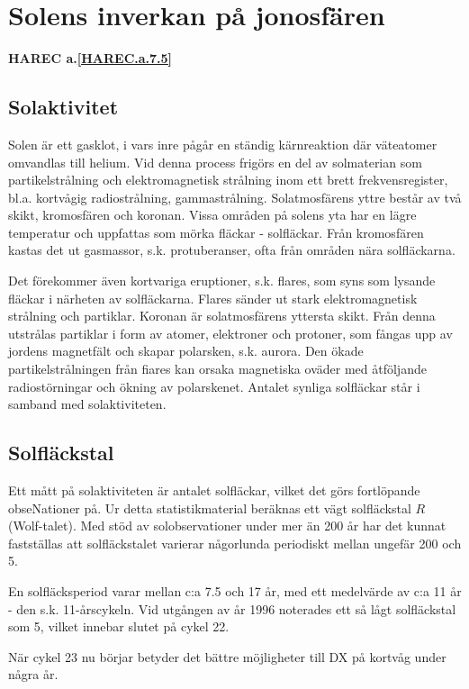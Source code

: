 \section{Solens inverkan på jonosfären}
\textbf{
HAREC a.\ref{HAREC.a.7.5}\label{myHAREC.a.7.5}
}

\subsection{Solaktivitet}

Solen är ett gasklot, i vars inre pågår en ständig kärnreaktion där
väteatomer omvandlas till helium. Vid denna process frigörs en del av
solmaterian som partikelstrålning och elektromagnetisk strålning inom
ett brett frekvensregister, bl.a. kortvågig radiostrålning,
gammastrålning. Solatmosfärens yttre består av två skikt, kromosfären
och koronan. Vissa områden på solens yta har en lägre temperatur och
uppfattas som mörka fläckar - solfläckar. Från kromosfären kastas det
ut gasmassor, s.k. protuberanser, ofta från områden nära solfläckarna.

Det förekommer även kortvariga eruptioner, s.k. flares, som syns som
lysande fläckar i närheten av solfläckarna. Flares sänder ut stark
elektromagnetisk strålning och partiklar. Koronan är solatmosfärens
yttersta skikt. Från denna utstrålas partiklar i form av atomer,
elektroner och protoner, som fångas upp av jordens magnetfält och
skapar polarsken, s.k. aurora. Den ökade partikelstrålningen från
fiares kan orsaka magnetiska oväder med åtföljande radiostörningar och
ökning av polarskenet. Antalet synliga solfläckar står i samband med
solaktiviteten.

\subsection{Solfläckstal}

Ett mått på solaktiviteten är antalet solfläckar, vilket det görs
fortlöpande obseNationer på. Ur detta statistikmaterial beräknas ett
vägt solfläckstal \(R\) (Wolf-talet). Med stöd av solobservationer
under mer än 200 år har det kunnat fastställas att solfläckstalet
varierar någorlunda periodiskt mellan ungefär 200 och 5.

En solfläcksperiod varar mellan c:a 7.5 och 17 år, med ett medelvärde
av c:a 11 år - den s.k. 11-årscykeln. Vid utgången av år 1996
noterades ett så lågt solfläckstal som 5, vilket innebar slutet på
cykel 22.

När cykel 23 nu börjar betyder det bättre möjligheter till DX på
kortvåg under några år.


